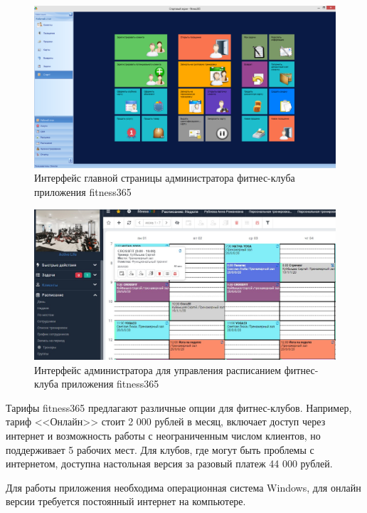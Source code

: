 \begin{figure}[ht!]
	\begin{center}
		\includegraphics[scale=0.35]{./img/f365-1.png}
	\end{center}
	\caption{Интерфейс главной страницы администратора фитнес-клуба приложения fitness365}
	\label{fig:f365-1}
\end{figure}

\begin{figure}[ht!]
	\begin{center}
		\includegraphics[scale=0.45]{./img/f365-2.png}
	\end{center}
	\caption{Интерфейс администратора для управления расписанием фитнес-клуба приложения fitness365}
	\label{fig:f365-2}
\end{figure}

Тарифы fitness365 предлагают различные опции для фитнес-клубов. Например, тариф <<Онлайн>> стоит 2 000 рублей в месяц, включает доступ через интернет и возможность работы с неограниченным числом клиентов, но поддерживает 5 рабочих мест. Для клубов, где могут быть проблемы с интернетом, доступна настольная версия за разовый платеж 44 000 рублей.

Для работы приложения необходима операционная система Windows, для онлайн версии требуется постоянный интернет на компьютере.

